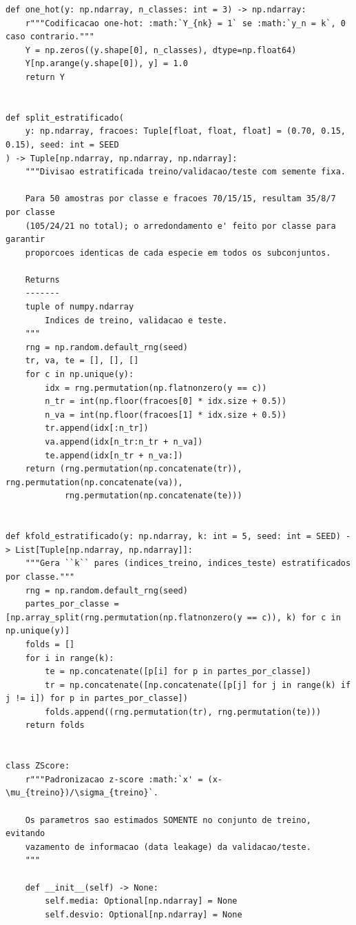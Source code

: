 \documentclass[12pt,a4paper]{article}
\begin{document}
{\begin{lstlisting}[caption={Programa completo \texttt{iris\_mlp.py}.},label={lst:iris_mlp}]
def one_hot(y: np.ndarray, n_classes: int = 3) -> np.ndarray:
    r"""Codificacao one-hot: :math:`Y_{nk} = 1` se :math:`y_n = k`, 0 caso contrario."""
    Y = np.zeros((y.shape[0], n_classes), dtype=np.float64)
    Y[np.arange(y.shape[0]), y] = 1.0
    return Y


def split_estratificado(
    y: np.ndarray, fracoes: Tuple[float, float, float] = (0.70, 0.15, 0.15), seed: int = SEED
) -> Tuple[np.ndarray, np.ndarray, np.ndarray]:
    """Divisao estratificada treino/validacao/teste com semente fixa.

    Para 50 amostras por classe e fracoes 70/15/15, resultam 35/8/7 por classe
    (105/24/21 no total); o arredondamento e' feito por classe para garantir
    proporcoes identicas de cada especie em todos os subconjuntos.

    Returns
    -------
    tuple of numpy.ndarray
        Indices de treino, validacao e teste.
    """
    rng = np.random.default_rng(seed)
    tr, va, te = [], [], []
    for c in np.unique(y):
        idx = rng.permutation(np.flatnonzero(y == c))
        n_tr = int(np.floor(fracoes[0] * idx.size + 0.5))
        n_va = int(np.floor(fracoes[1] * idx.size + 0.5))
        tr.append(idx[:n_tr])
        va.append(idx[n_tr:n_tr + n_va])
        te.append(idx[n_tr + n_va:])
    return (rng.permutation(np.concatenate(tr)), rng.permutation(np.concatenate(va)),
            rng.permutation(np.concatenate(te)))


def kfold_estratificado(y: np.ndarray, k: int = 5, seed: int = SEED) -> List[Tuple[np.ndarray, np.ndarray]]:
    """Gera ``k`` pares (indices_treino, indices_teste) estratificados por classe."""
    rng = np.random.default_rng(seed)
    partes_por_classe = [np.array_split(rng.permutation(np.flatnonzero(y == c)), k) for c in np.unique(y)]
    folds = []
    for i in range(k):
        te = np.concatenate([p[i] for p in partes_por_classe])
        tr = np.concatenate([np.concatenate([p[j] for j in range(k) if j != i]) for p in partes_por_classe])
        folds.append((rng.permutation(tr), rng.permutation(te)))
    return folds


class ZScore:
    r"""Padronizacao z-score :math:`x' = (x-\mu_{treino})/\sigma_{treino}`.

    Os parametros sao estimados SOMENTE no conjunto de treino, evitando
    vazamento de informacao (data leakage) da validacao/teste.
    """

    def __init__(self) -> None:
        self.media: Optional[np.ndarray] = None
        self.desvio: Optional[np.ndarray] = None


\end{lstlisting}}
\end{document}

